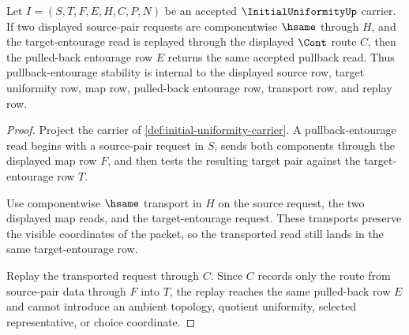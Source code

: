 \begin{theorem}
\label{thm:initial-uniformity-pullback-entourage-stability}
Let $I=(S,T,F,E,H,C,P,N)$ be an accepted $\InitialUniformityUp$ carrier. If two displayed source-pair requests are componentwise $\hsame$ through $H$, and the target-entourage read is replayed through the displayed $\Cont$ route $C$, then the pulled-back entourage row $E$ returns the same accepted pullback read. Thus pullback-entourage stability is internal to the displayed source row, target uniformity row, map row, pulled-back entourage row, transport row, and replay row.
\end{theorem}
\begin{proof}
Project the carrier of \autoref{def:initial-uniformity-carrier}. A pullback-entourage read begins with a source-pair request in $S$, sends both components through the displayed map row $F$, and then tests the resulting target pair against the target-entourage row $T$.

Use componentwise $\hsame$ transport in $H$ on the source request, the two displayed map reads, and the target-entourage request. These transports preserve the visible coordinates of the packet, so the transported read still lands in the same target-entourage row.

Replay the transported request through $C$. Since $C$ records only the route from source-pair data through $F$ into $T$, the replay reaches the same pulled-back row $E$ and cannot introduce an ambient topology, quotient uniformity, selected representative, or choice coordinate.
\end{proof}

